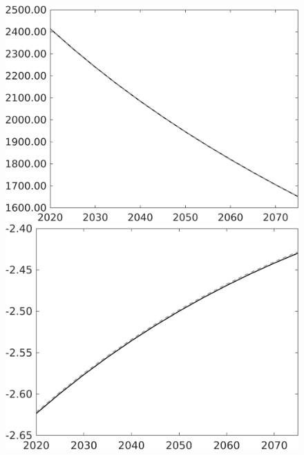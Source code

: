 \begin{figure}[h!!]
\begin{minipage}[]{0.32\textwidth}
		\includegraphics[width=1\textwidth]{../../codding_model/own_basedOnFried/optimalPol_010922_revision/figures/all_13Sept22/PerdifNoTauf_regime0_CompTaul_sg_spillover0_nsk0_xgr0_knspil0_sep0_LFlimit0_emsbase0_countec0_GovRev0_etaa0.79_lgd0.png}
	\end{minipage}
\begin{minipage}[]{0.32\textwidth}
\includegraphics[width=1\textwidth]{../../codding_model/own_basedOnFried/optimalPol_010922_revision/figures/all_13Sept22/PerdifNoTauf_regime0_CompTaul_sn_spillover0_nsk0_xgr0_knspil0_sep0_LFlimit0_emsbase0_countec0_GovRev0_etaa0.79_lgd0.png}
\end{minipage}	

\end{figure}
